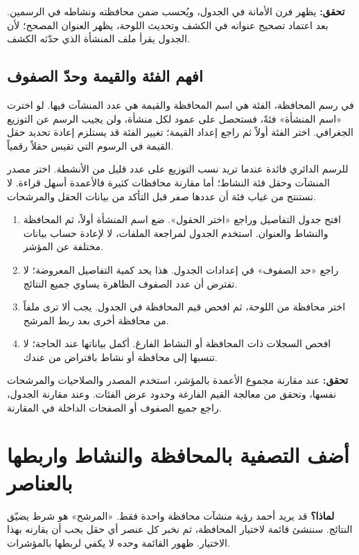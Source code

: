 \textbf{تحقق:} يظهر فرن الأمانة في الجدول، ويُحسب ضمن محافظته ونشاطه في الرسمين. بعد اعتماد تصحيح عنوانه في الكشف وتحديث اللوحة، يظهر العنوان المصحح؛ لأن الجدول يقرأ ملف المنشأة الذي حدّثه الكشف.

\subsection{افهم الفئة والقيمة وحدّ الصفوف}

في رسم المحافظة، الفئة هي اسم المحافظة والقيمة هي عدد المنشآت فيها. لو اخترت «اسم المنشأة» فئةً، فستحصل على عمود لكل منشأة، ولن يجيب الرسم عن التوزيع الجغرافي. اختر الفئة أولاً ثم راجع إعداد القيمة؛ تغيير الفئة قد يستلزم إعادة تحديد حقل القيمة في الرسوم التي تقيس حقلاً رقمياً.

للرسم الدائري فائدة عندما تريد نسب التوزيع على عدد قليل من الأنشطة. اختر مصدر المنشآت وحقل فئة النشاط؛ أما مقارنة محافظات كثيرة فالأعمدة أسهل قراءة. لا تستنتج من غياب فئة أن عددها صفر قبل التأكد من بيانات الحقل والمرشحات.

\begin{enumerate}
\item افتح جدول التفاصيل وراجع «اختر الحقول». ضع اسم المنشأة أولاً، ثم المحافظة والنشاط والعنوان. استخدم الجدول لمراجعة الملفات، لا لإعادة حساب بيانات مختلفة عن المؤشر.
\item راجع «حد الصفوف» في إعدادات الجدول. هذا يحد كمية التفاصيل المعروضة؛ لا تفترض أن عدد الصفوف الظاهرة يساوي جميع النتائج.
\item اختر محافظة من اللوحة، ثم افحص قيم المحافظة في الجدول. يجب ألا ترى ملفاً من محافظة أخرى بعد ربط المرشح.
\item افحص السجلات ذات المحافظة أو النشاط الفارغ. أكمل بياناتها عند الحاجة؛ لا تنسبها إلى محافظة أو نشاط بافتراض من عندك.
\end{enumerate}

\textbf{تحقق:} عند مقارنة مجموع الأعمدة بالمؤشر، استخدم المصدر والصلاحيات والمرشحات نفسها، وتحقق من معالجة القيم الفارغة وحدود عرض الفئات. وعند مقارنة الجدول، راجع جميع الصفوف أو الصفحات الداخلة في المقارنة.

\section{أضف التصفية بالمحافظة والنشاط واربطها بالعناصر}
\label{sec:build-dashboard-filters}

\textbf{لماذا؟} قد يريد أحمد رؤية منشآت محافظة واحدة فقط. «المرشح» هو شرط يضيّق النتائج. سننشئ قائمة لاختيار المحافظة، ثم نخبر كل عنصر أي حقل يجب أن يقارنه بهذا الاختيار. ظهور القائمة وحده لا يكفي لربطها بالمؤشرات.


